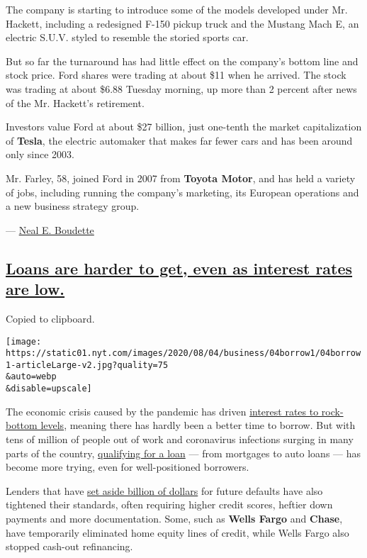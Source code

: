 The company is starting to introduce some of the models developed under
Mr. Hackett, including a redesigned F-150 pickup truck and the Mustang
Mach E, an electric S.U.V. styled to resemble the storied sports car.

But so far the turnaround has had little effect on the company's bottom
line and stock price. Ford shares were trading at about \$11 when he
arrived. The stock was trading at about \$6.88 Tuesday morning, up more
than 2 percent after news of the Mr. Hackett's retirement.

Investors value Ford at about \$27 billion, just one-tenth the market
capitalization of \textbf{Tesla}, the electric automaker that makes far
fewer cars and has been around only since 2003.

Mr. Farley, 58, joined Ford in 2007 from \textbf{Toyota Motor}, and has
held a variety of jobs, including running the company's marketing, its
European operations and a new business strategy group.

--- \href{https://www.nytimes.com/by/neal-e-boudette}{Neal E. Boudette}

\hypertarget{loans-are-harder-to-get-even-as-interest-rates-are-low}{%
\subsection{\texorpdfstring{\protect\hyperlink{loans-are-harder-to-get-even-as-interest-rates-are-low}{Loans
are harder to get, even as interest rates are
low.}}{Loans are harder to get, even as interest rates are low.}}\label{loans-are-harder-to-get-even-as-interest-rates-are-low}}

Copied to clipboard.

\texttt{[image: https://static01.nyt.com/images/2020/08/04/business/04borrow1/04borrow1-articleLarge-v2.jpg?quality=75\\\&auto=webp\\\&disable=upscale]}

The economic crisis caused by the pandemic has driven
\href{https://www.nytimes.com/2020/07/16/business/mortgage-rates-below-3-percent.html}{interest
rates to rock-bottom levels}, meaning there has hardly been a better
time to borrow. But with tens of million of people out of work and
coronavirus infections surging in many parts of the country,
\href{https://www.nytimes.com/2020/08/04/your-money/mortgage-loans-credit-cards-coronavirus.html}{qualifying
for a loan} --- from mortgages to auto loans --- has become more trying,
even for well-positioned borrowers.

Lenders that have
\href{https://www.nytimes.com/2020/07/14/business/big-banks-quarterly-results.html}{set
aside billion of dollars} for future defaults have also tightened their
standards, often requiring higher credit scores, heftier down payments
and more documentation. Some, such as \textbf{Wells Fargo} and
\textbf{Chase}, have temporarily eliminated home equity lines of credit,
while Wells Fargo also stopped cash-out refinancing.

